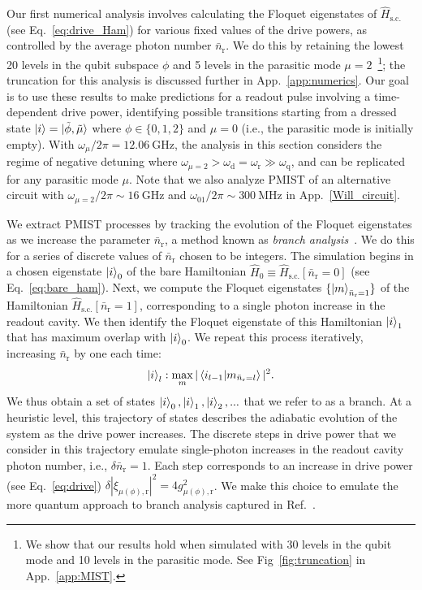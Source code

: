 \documentclass[%
reprint,
superscriptaddress,
 amsmath,amssymb,
 aps,
 prx,
longbibliography,
floatfix,
]{revtex4-2}
\begin{document}
Our first numerical analysis involves calculating the Floquet eigenstates of $\hat H_\textrm{s.c.}$ (see Eq.~\ref{eq:drive_Ham}) for various fixed values of the drive powers, as controlled by the average photon number $\bar n_\textrm{r}$. We do this by retaining the lowest 20 levels in the qubit subspace $\phi$ and 5 levels in the parasitic mode $\mu=2$~\footnote{We show that our results hold when simulated with 30 levels in the qubit mode and 10 levels in the parasitic mode. See Fig~\ref{fig:truncation} in App.~\ref{app:MIST}.}; the truncation for this analysis is discussed further in App.~\ref{app:numerics}. Our goal is to use these results to make predictions for a readout pulse involving a time-dependent drive power, identifying possible transitions starting from a dressed state $\ket{i} =\ket{\tilde{\phi}, \tilde{\mu}}$ where $\phi\in\{0,1,2\}$ and $\mu=0$ (i.e., the parasitic mode is initially empty). With $\omega_\mu/2\pi=12.06 \ \mathrm{GHz}$, the analysis in this section considers the regime of negative detuning where $\omega_{\mu=2}>\omega_\textrm{d}=\omega_\textrm{r} \gg \omega_\textrm{q}$, and can be replicated for any parasitic mode $\mu$. Note that we also analyze PMIST of an alternative circuit with $\omega_{\mu=2}/2\pi\sim 16 \ \mathrm{GHz}$ and $\omega_{01}/2\pi\sim 300 \ \mathrm{MHz}$ in App.~\ref{Will_circuit}.

We extract PMIST processes by tracking the evolution of the Floquet eigenstates as we increase the parameter $\bar{n}_\textrm{r}$, a method known as \emph{branch analysis}~\cite{dumas2024unified,cohen2023reminiscence}. We do this for a series of discrete values of $\bar{n}_\textrm{r}$ chosen to be integers. The simulation begins in a chosen eigenstate $\ket{i}_0$ of the bare Hamiltonian $\hat{H}_0 \equiv \hat{H}_\textrm{s.c.}[\bar{n}_\mathrm{r}=0]$ (see Eq.~\ref{eq:bare_ham}). Next, we compute the Floquet eigenstates $\{\ket{m}_{\bar n_\textrm{r}=1}\}$ of the Hamiltonian $\hat{H}_\textrm{s.c.}[\bar{n}_\textrm{r}=1]$, corresponding to a single photon increase in the readout cavity. We then identify the Floquet eigenstate of this Hamiltonian $\ket{i}_1$ that has maximum overlap with $\ket{i}_0$. We repeat this process iteratively, increasing $\bar{n}_\textrm{r}$ by one each time:
\begin{align}
\ket{i}_l:\max_{m}|\braket{i_{l-1}|{m}_{\bar n_\textrm{r}=l}}|^2.\label{eq:track_Floquet}   
\end{align}
We thus obtain a set of states $\ket{i}_0,\ket{i}_1,\ket{i}_2,...$ that we refer to as a branch. At a heuristic level, this trajectory of states describes the adiabatic evolution of the system as the drive power increases. The discrete steps in drive power that we consider in this trajectory emulate single-photon increases in the readout cavity photon number, i.e., $\delta \bar n_\textrm{r}=1$. Each step corresponds to an increase in drive power (see Eq.~\ref{eq:drive}) $\delta |\xi_{\mu (\phi),\textrm{r}}|^2=4g_{\mu (\phi),\textrm{r}}^2$. We make this choice to emulate the more quantum approach to branch analysis captured in Ref.~\cite{shillito2022dynamics,dumas2024unified}.
\end{document}
